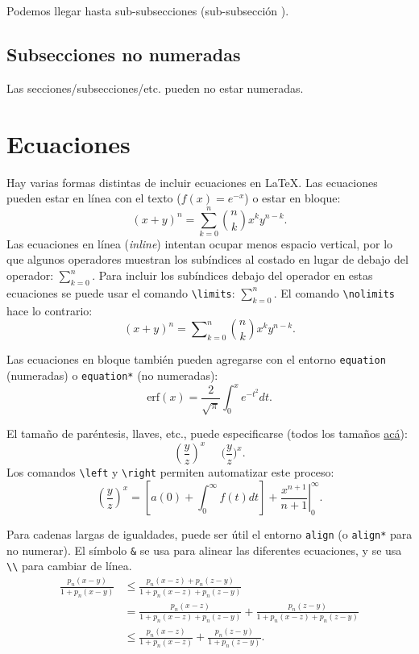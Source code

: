 \documentclass[12pt, spanish]{article}
\theoremstyle{definition} %
\theoremstyle{remark} %
\theoremstyle{plain} %
\theoremstyle{plain} %
\theoremstyle{plain} %
\theoremstyle{plain} %
\theoremstyle{plain} %
\theoremstyle{remark} %
\begin{document}
Podemos llegar hasta sub-subsecciones (sub-subsección \thesubsubsection).

\subsection*{Subsecciones no numeradas}

Las secciones/subsecciones/etc. pueden no estar numeradas.


\section{Ecuaciones}

Hay varias formas distintas de incluir ecuaciones en \LaTeX. Las ecuaciones pueden estar en línea con el texto ($f(x) = e^{-x}$) o estar en bloque: 
\[
(x+y)^n = \sum_{k=0}^n \binom{n}{k} x^k y^{n-k}.
\]
Las ecuaciones en línea (\textit{inline}) intentan ocupar menos espacio vertical, por lo que algunos operadores muestran los subíndices al costado en lugar de debajo del operador: $\sum_{k=0}^n$. Para incluir los subíndices debajo del operador en estas ecuaciones se puede usar el comando \verb|\limits|: $\sum\limits_{k=0}^n$. El comando \verb|\nolimits| hace lo contrario:
\[
(x+y)^n = \sum\nolimits_{k=0}^n \binom{n}{k} x^k y^{n-k}.
\]

Las ecuaciones en bloque también pueden agregarse con el entorno \verb|equation| (numeradas) o \verb|equation*| (no numeradas):
\begin{equation}
    \text{erf}(x) = \frac{2}{\sqrt{\pi}} \int_0^x e^{-t^2} dt.
\end{equation}

El tamaño de paréntesis, llaves, etc., puede especificarse (todos los tamaños \href{www.overleaf.com/learn/latex/Brackets_and_Parentheses}{acá}): \[
    (\frac{y}{z})^x\;\;\;\;\;\Big(\frac{y}{z}\Big)^x.
\]
Los comandos \verb|\left| y \verb|\right| permiten automatizar este proceso:
\[
    \left(\frac{y}{z}\right)^x = \left[ a(0) + \int_0^\infty f(t)dt\right] + \left. \frac{x^{n+1}}{n+1} \right|_0^\infty.
\]

Para cadenas largas de igualdades, puede ser útil el entorno \verb|align| (o \verb|align*| para no numerar). El símbolo \verb|&| se usa para alinear las diferentes ecuaciones, y se usa \verb|\\| para cambiar de línea.
\begin{align*}
    \frac{p_n(x - y)}{1 + p_n(x - y)} &\leq \frac{p_n(x - z) + p_n(z - y)}{1 + p_n(x - z) + p_n(z - y)} \\
    &= \frac{p_n(x - z)}{1 + p_n(x - z) + p_n(z - y)} + \frac{p_n(z - y)}{1 + p_n(x - z) + p_n(z - y)} \\
    &\leq \frac{p_n(x - z)}{1 + p_n(x - z)} + \frac{p_n(z - y)}{1 + p_n(z - y)}.
\end{align*}
\end{document}
